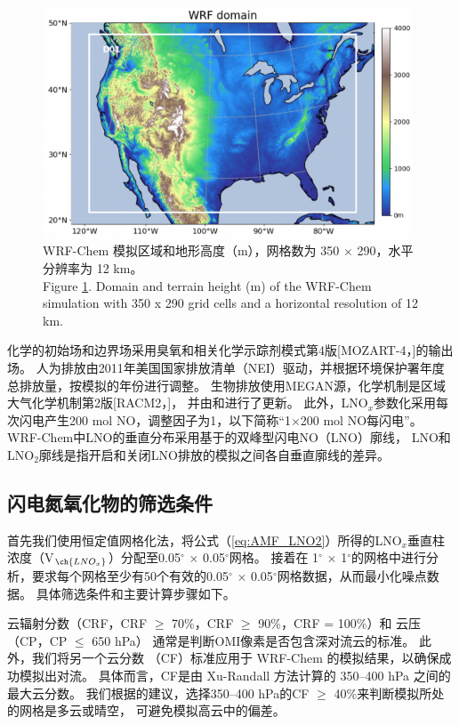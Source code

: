 \begin{figure}[H]
\centering
\includegraphics[width=11cm]{./figures/us_domain.png}
\caption{WRF-Chem 模拟区域和地形高度（m），网格数为 350 $\times$ 290，水平分辨率为 12 km。 \\
Figure \ref{fig:us_domain}. Domain and terrain height (m) of the WRF-Chem simulation with 350 x 290 grid cells and a horizontal resolution of 12 km.}
\label{fig:us_domain}
\end{figure}

化学的初始场和边界场采用臭氧和相关化学示踪剂模式第4版[MOZART-4，\citet{Emmons.2010}]的输出场。
人为排放由2011年美国国家排放清单（NEI）驱动，并根据环境保护署年度总排放量，按模拟的年份进行调整\citep{EPA.2015}。
生物排放使用MEGAN源，化学机制是区域大气化学机制第2版[RACM2，\citet{Goliff.2013}]，
并由\citet{Browne.2014}和\citet{Schwantes.2015}进行了更新。
此外，LNO$_x$参数化采用每次闪电产生200 mol NO，调整因子为1，以下简称“1$\times$200 mol NO每闪电”。
WRF-Chem中LNO的垂直分布采用基于\citet{Ott.2010}的双峰型闪电NO（LNO）廓线\citep{Laughner.2017}，
LNO和LNO$_2$廓线是指开启和关闭LNO排放的模拟之间各自垂直廓线的差异。


\subsection{闪电氮氧化物的筛选条件}

首先我们使用恒定值网格化法，将公式（\ref{eq:AMF_LNO2}）所得的LNO$_x$垂直柱浓度（V$_{\ch{LNO_x}}$）分配至0.05$^{\circ}$ $\times$ 0.05$^{\circ}$网格\citep{Kuhlmann.2014}。
接着在 1$^{\circ}$ $\times$ 1$^{\circ}$的网格中进行分析，要求每个网格至少有50个有效的0.05$^{\circ}$ $\times$ 0.05$^{\circ}$网格数据，从而最小化噪点数据。
具体筛选条件和主要计算步骤如下。

云辐射分数（CRF，CRF $\geq$ 70\%，CRF $\geq$ 90\%，CRF = 100\%）和 云压（CP，CP $\leq$ 650 hPa）
通常是判断OMI像素是否包含深对流云的标准\citep{Ziemke.2009,Choi.2014,Pickering.2016}。
此外，我们将另一个云分数 （CF）标准应用于 WRF-Chem 的模拟结果，以确保成功模拟出对流。
具体而言，CF是由 Xu-Randall 方法计算的 350--400 hPa 之间的最大云分数\citep{Xu.1996,Strode.2017}。
我们根据\citet{Strode.2017}的建议，选择350--400 hPa的CF $\geq$ 40\%来判断模拟所处的网格是多云或晴空，
可避免模拟高云中的偏差。

